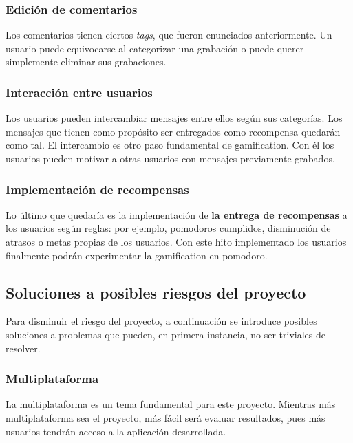 \documentclass[12pt,letterpaper]{report}
\begin{document}
\subsubsection{Edición de comentarios}

Los comentarios tienen ciertos \emph{tags}, que fueron enunciados
anteriormente. Un usuario puede equivocarse al categorizar una
grabación o puede querer simplemente eliminar sus grabaciones.

\subsubsection{Interacción entre usuarios}

Los usuarios pueden intercambiar mensajes entre ellos según sus
categorías. Los mensajes que tienen como propósito ser entregados como
recompensa quedarán como tal. El intercambio es otro paso fundamental
de gamification. Con él los usuarios pueden motivar a otras usuarios
con mensajes previamente grabados.

\subsubsection{Implementación de recompensas}

Lo último que quedaría es la implementación de \textbf{la entrega de
recompensas} a los usuarios según reglas: por ejemplo, pomodoros
cumplidos, disminución de atrasos o metas propias de los usuarios. Con
este hito implementado los usuarios finalmente podrán experimentar la
gamification en pomodoro.

\subsection{Soluciones a posibles riesgos del proyecto}

Para disminuir el riesgo del proyecto, a continuación se introduce
posibles soluciones a problemas que pueden, en primera instancia, no
ser triviales de resolver.


\subsubsection{Multiplataforma}\label{multiplataforma}

La multiplataforma es un tema fundamental para este proyecto. Mientras
más multiplataforma sea el proyecto, más fácil será evaluar
resultados, pues más usuarios tendrán acceso a la aplicación
desarrollada.
\end{document}
